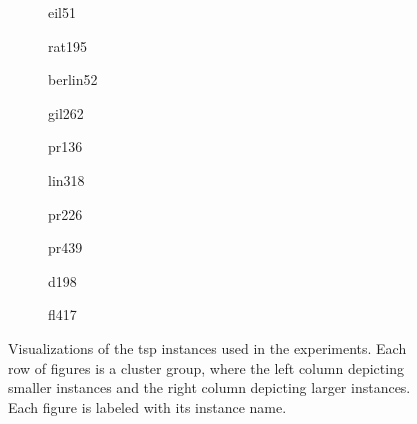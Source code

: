 \begin{figure}[h!]
	\captionsetup[subfigure]{aboveskip=-1pt,belowskip=2pt}
	\centering
	\begin{subfigure}{0.3\textwidth}
		\centering
		\caption{eil51}
		\label{fig:eil51}
	\end{subfigure} 
	\begin{subfigure}{0.3\textwidth}
		\centering
		\caption{rat195}
		\label{fig:rat195}
	\end{subfigure}

	\begin{subfigure}{0.3\textwidth}
		\centering
		\caption{berlin52}
		\label{fig:berlin52}
	\end{subfigure} 
	\begin{subfigure}{0.3\textwidth}
		\centering
		\caption{gil262}
		\label{fig:gil262}
	\end{subfigure}

	\begin{subfigure}{0.3\textwidth}
		\centering
		\caption{pr136}
		\label{fig:pr136}
	\end{subfigure} 
	\begin{subfigure}{0.3\textwidth}
		\centering
		\caption{lin318}
		\label{fig:lin318}
	\end{subfigure}

	\begin{subfigure}{0.3\textwidth}
		\centering
		\caption{pr226}
		\label{fig:pr226}
	\end{subfigure} 
	\begin{subfigure}{0.3\textwidth}
		\centering
		\caption{pr439}
		\label{fig:pr439}
	\end{subfigure}

	\begin{subfigure}{0.3\textwidth}
		\centering
		\caption{d198}
		\label{fig:d198}
	\end{subfigure} 
	\begin{subfigure}{0.3\textwidth}
		\centering
		\caption{fl417}
		\label{fig:fl417}
	\end{subfigure}

	\caption[Visualizations of the \gls{tsp} instances used in the experiments]{Visualizations of the \gls{tsp} instances used in the experiments. Each row of figures is a cluster group, where the left column depicting smaller instances and the right column depicting larger instances. Each figure is labeled with its instance name.}
	\label{fig:cluster-groups}
\end{figure}

